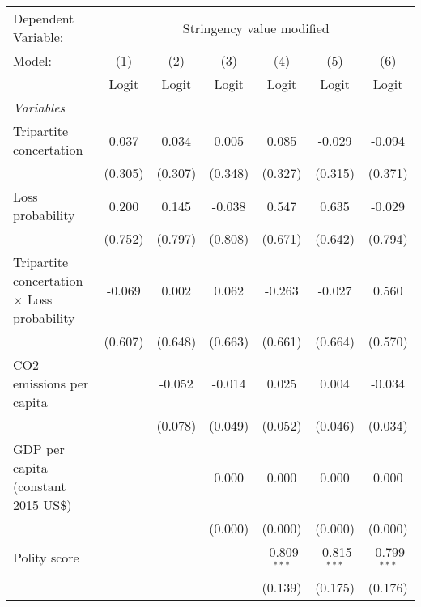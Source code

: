
\begingroup
\centering
\begin{tabular}{lcccccc}
   \toprule
   Dependent Variable: & \multicolumn{6}{c}{Stringency value modified}\\
   Model:                                             & (1)     & (2)     & (3)     & (4)            & (5)            & (6)\\  
                                                      &  Logit  & Logit   & Logit   & Logit          & Logit          & Logit\\  
   \midrule
   \emph{Variables}\\
   Tripartite concertation                            & 0.037   & 0.034   & 0.005   & 0.085          & -0.029         & -0.094\\   
                                                      & (0.305) & (0.307) & (0.348) & (0.327)        & (0.315)        & (0.371)\\   
   Loss probability                                   & 0.200   & 0.145   & -0.038  & 0.547          & 0.635          & -0.029\\   
                                                      & (0.752) & (0.797) & (0.808) & (0.671)        & (0.642)        & (0.794)\\   
   Tripartite concertation $\times$ Loss probability  & -0.069  & 0.002   & 0.062   & -0.263         & -0.027         & 0.560\\   
                                                      & (0.607) & (0.648) & (0.663) & (0.661)        & (0.664)        & (0.570)\\   
   CO2 emissions per capita                           &         & -0.052  & -0.014  & 0.025          & 0.004          & -0.034\\   
                                                      &         & (0.078) & (0.049) & (0.052)        & (0.046)        & (0.034)\\   
   GDP per capita (constant 2015 US\$)                &         &         & 0.000   & 0.000          & 0.000          & 0.000\\   
                                                      &         &         & (0.000) & (0.000)        & (0.000)        & (0.000)\\   
   Polity score                                       &         &         &         & -0.809$^{***}$ & -0.815$^{***}$ & -0.799$^{***}$\\   
                                                      &         &         &         & (0.139)        & (0.175)        & (0.176)\\   

\end{tabular}

